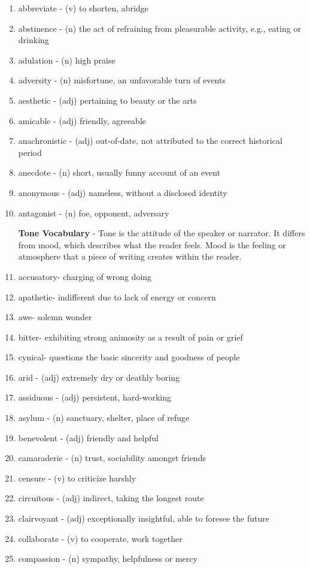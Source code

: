 \documentclass[12pt]{book}
\begin{document}
\begin{enumerate}
\item abbreviate - (v) to shorten, abridge
\item abstinence - (n) the act of refraining from pleasurable activity, e.g., eating or drinking
\item adulation - (n) high praise
\item adversity - (n) misfortune, an unfavorable turn of events
\item aesthetic - (adj) pertaining to beauty or the arts
\item amicable - (adj) friendly, agreeable
\item anachronistic - (adj) out-of-date, not attributed to the correct historical period
\item anecdote - (n) short, usually funny account of an event
\item anonymous - (adj) nameless, without a disclosed identity
\item antagonist - (n) foe, opponent, adversary

\bigskip
\textbf{Tone Vocabulary} - Tone is the attitude of the speaker or narrator.  It differs from mood, which describes what the reader feels.  Mood is the feeling or atmosphere that a piece of writing creates within the reader.  

\bigskip
\item accusatory- charging of wrong doing
\item apathetic- indifferent due to lack of energy or concern
\item awe- solemn wonder
\item bitter- exhibiting strong animosity as a result of pain or grief
\item cynical- questions the basic sincerity and goodness of people

\bigskip
\item arid - (adj) extremely dry or deathly boring
\item assiduous - (adj) persistent, hard-working
\item asylum - (n) sanctuary, shelter, place of refuge
\item benevolent - (adj) friendly and helpful
\item camaraderie - (n) trust, sociability amongst friends
\item censure - (v) to criticize harshly
\item circuitous - (adj) indirect, taking the longest route
\item clairvoyant - (adj) exceptionally insightful, able to foresee the future
\item collaborate - (v) to cooperate, work together
\item compassion - (n) sympathy, helpfulness or mercy


\end{enumerate}
\end{document}
